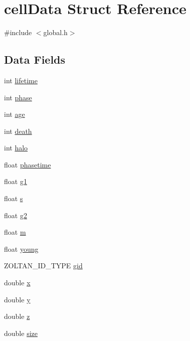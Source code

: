\hypertarget{structcellData}{\section{cell\-Data Struct Reference}
\label{structcellData}
}


{\ttfamily \#include $<$global.\-h$>$}

\subsection*{Data Fields}
\begin{DoxyCompactItemize}
\item 
int \hyperlink{structcellData_ada4af333b662b0bba80e2f5e273fe4ea}{lifetime}
\item 
int \hyperlink{structcellData_accf3aec63bc20b3c99ab4881cb07c05b}{phase}
\item 
int \hyperlink{structcellData_a91d98a856bbd96810b40af3ca5cc901a}{age}
\item 
int \hyperlink{structcellData_add1e1533be6e693ffedcdbafdf8b855c}{death}
\item 
int \hyperlink{structcellData_a80ff3fcc4d03d0b1b01559839d12df5b}{halo}
\item 
float \hyperlink{structcellData_afe1297f954440c453b59fcb06992dbd5}{phasetime}
\item 
float \hyperlink{structcellData_a581debe7d16bce9d187b97855f4e99d4}{g1}
\item 
float \hyperlink{structcellData_a874f74a4dc1c9a0cd9c6e0d79c298f55}{s}
\item 
float \hyperlink{structcellData_aee9971139118d56815564304450c4775}{g2}
\item 
float \hyperlink{structcellData_ac51334f57ef8b81c0629c9421798c344}{m}
\item 
float \hyperlink{structcellData_ad0bd87a264e65d1c17ecc07049819f2c}{young}
\item 
Z\-O\-L\-T\-A\-N\-\_\-\-I\-D\-\_\-\-T\-Y\-P\-E \hyperlink{structcellData_abb4d4bd9231e9f994e87f32cc4fcfce8}{gid}
\item 
double \hyperlink{structcellData_af88b946fb90d5f08b5fb740c70e98c10}{x}
\item 
double \hyperlink{structcellData_ab927965981178aa1fba979a37168db2a}{y}
\item 
double \hyperlink{structcellData_ab3e6ed577a7c669c19de1f9c1b46c872}{z}
\item 
double \hyperlink{structcellData_aba3c5d750d5dbd6e86c11ecaca62885e}{size}

\end{DoxyCompactItemize}
